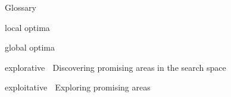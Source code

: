 
\begin{dictionary}{Glossary}
\item[local optima] 
\item[global optima] 
\item[explorative]   $\;$   Discovering promising areas in the search space
\item[exploitative]   $\;$   Exploring promising areas
\end{dictionary}
